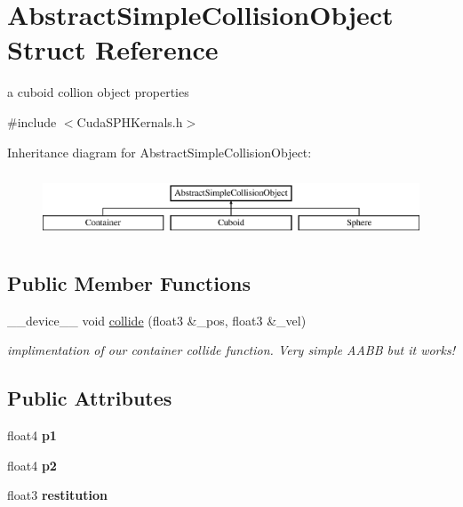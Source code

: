 \hypertarget{struct_abstract_simple_collision_object}{\section{Abstract\-Simple\-Collision\-Object Struct Reference}
\label{struct_abstract_simple_collision_object}
}


a cuboid collion object properties  




{\ttfamily \#include $<$Cuda\-S\-P\-H\-Kernals.\-h$>$}

Inheritance diagram for Abstract\-Simple\-Collision\-Object\-:\begin{figure}[H]
\begin{center}
\leavevmode
\includegraphics[height=1.975309cm]{struct_abstract_simple_collision_object}
\end{center}
\end{figure}
\subsection*{Public Member Functions}
\begin{DoxyCompactItemize}
\item 
\-\_\-\-\_\-device\-\_\-\-\_\- void \hyperlink{struct_abstract_simple_collision_object_af076627a616e71d91d032ff5928e3ffc}{collide} (float3 \&\-\_\-pos, float3 \&\-\_\-vel)
\begin{DoxyCompactList}\small\item\em implimentation of our container collide function. Very simple A\-A\-B\-B but it works! \end{DoxyCompactList}\end{DoxyCompactItemize}
\subsection*{Public Attributes}
\begin{DoxyCompactItemize}
\item 
\hypertarget{struct_abstract_simple_collision_object_ab2e8bf6822f7fbad9032cb20a2300bdd}{float4 {\bfseries p1}}\label{struct_abstract_simple_collision_object_ab2e8bf6822f7fbad9032cb20a2300bdd}

\item 
\hypertarget{struct_abstract_simple_collision_object_a6a47307e3c46a0ef8c0d5ecaaabe32e8}{float4 {\bfseries p2}}\label{struct_abstract_simple_collision_object_a6a47307e3c46a0ef8c0d5ecaaabe32e8}

\item 
\hypertarget{struct_abstract_simple_collision_object_aaa566a8445dec22e51ef4cecec5c21fd}{float3 {\bfseries restitution}}\label{struct_abstract_simple_collision_object_aaa566a8445dec22e51ef4cecec5c21fd}

\end{DoxyCompactItemize}


